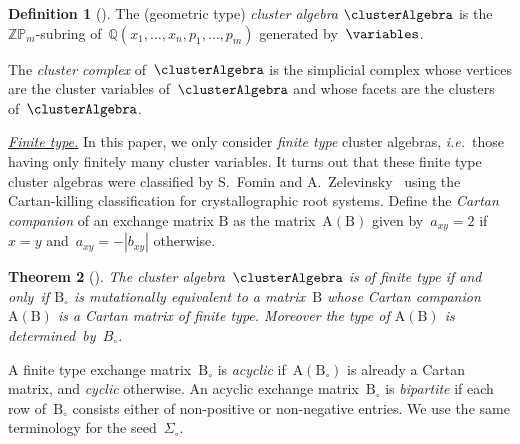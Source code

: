 \documentclass{amsart}
\newtheorem{theorem}{Theorem}[section]
\theoremstyle{definition}
\newtheorem{definition}[theorem]{Definition}
\newcommand{\Q}{\mathbb{Q}} %
\newcommand{\Z}{\mathbb{Z}} %
\newcommand{\ie}{\textit{i.e.}~} %
\newcommand{\darkblue}{\color{darkblue}} %
\newcommand{\defn}[1]{\textsl{\darkblue #1}} %
\newcommand{\para}[1]{\medskip\noindent\uline{\textit{#1.}}} %
\newcommand{\Trop}[1]{\mathbb{P}_{#1}} %
\newcommand{\seed}{\Sigma} %
\newcommand{\cluster}{\mathrm{X}} %
\newcommand{\coefficients}{\mathrm{P}} %
\newcommand{\B}{\mathrm{B}} %
\newcommand{\A}[1]{\mathrm{A}({#1})} %
\begin{document}
\begin{definition}[{\cite[Def.~2.11]{FominZelevinsky-ClusterAlgebrasIV}}]
The (geometric type) \defn{cluster algebra} $\clusterAlgebra$ is the $\Z\Trop{m}$-subring of~$\Q(x_1, \dots, x_n, p_1, \dots, p_m)$ generated by~$\variables$.
\end{definition}

The \defn{cluster complex} of~$\clusterAlgebra$ is the simplicial complex whose vertices are the cluster variables of~$\clusterAlgebra$ and whose facets are the clusters of~$\clusterAlgebra$.

\para{Finite type}
%
In this paper, we only consider \defn{finite type} cluster algebras, \ie those having only finitely many cluster variables.
It turns out that these finite type cluster algebras were classified by S.~Fomin and A.~Zelevinsky~\cite{FominZelevinsky-ClusterAlgebrasII} using the Cartan-killing classification for crystallographic root systems.
Define the \defn{Cartan companion} of an exchange matrix $\B$ as the matrix~$\A{\B}$ given by~$a_{xy} = 2$ if~$x = y$ and~$a_{xy} = -|b_{xy}|$ otherwise.

\begin{theorem}[{\cite[Theorem~1.4]{FominZelevinsky-ClusterAlgebrasII}}]
\label{thm:finiteTypeClassification}
The cluster algebra~$\clusterAlgebra$ is of finite type if and only~if $\B_\circ$ is mutationally equivalent to a matrix~$\B$ whose Cartan companion~$\A{\B}$ is a Cartan matrix of finite type. Moreover the type of $\A{\B}$ is determined~by~$B_\circ$.
\end{theorem}

A finite type exchange matrix~$\B_\circ$ is \defn{acyclic} if~$\A{\B_\circ}$ is already a Cartan matrix, and \defn{cyclic} otherwise.
An acyclic exchange matrix~$\B_\circ$ is \defn{bipartite} if each row of~$\B_\circ$ consists either of non-positive or non-negative entries.
We use the same terminology for the seed~$\seed_\circ$.
\end{document}

